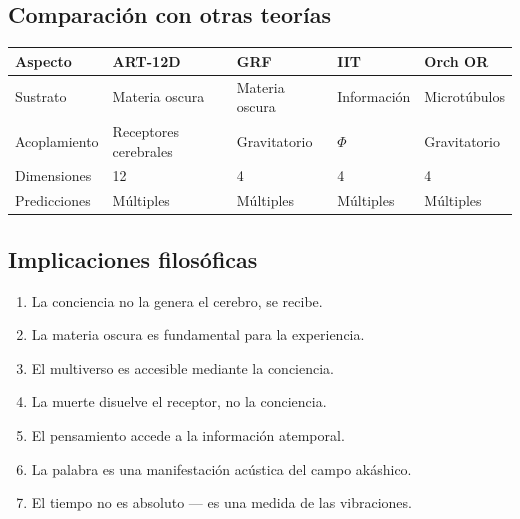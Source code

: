 \subsection{Comparación con otras teorías}
\begin{table}[H]
\centering
\begin{tabular}{@{}lllll@{}}
\toprule
\textbf{Aspecto} & \textbf{ART-12D} & \textbf{GRF} & \textbf{IIT} & \textbf{Orch OR} \\ \midrule
Sustrato & Materia oscura & Materia oscura & Información & Microtúbulos \\
Acoplamiento & Receptores cerebrales & Gravitatorio & $\Phi$ & Gravitatorio \\
Dimensiones & 12 & 4 & 4 & 4 \\
Predicciones & Múltiples & Múltiples & Múltiples & Múltiples \\ \bottomrule
\end{tabular}
\end{table}

\subsection{Implicaciones filosóficas}
\begin{enumerate}
    \item La conciencia no la genera el cerebro, se recibe.
    \item La materia oscura es fundamental para la experiencia.
    \item El multiverso es accesible mediante la conciencia.
    \item La muerte disuelve el receptor, no la conciencia.
    \item El pensamiento accede a la información atemporal.
    \item La palabra es una manifestación acústica del campo akáshico.
    \item El tiempo no es absoluto --- es una medida de las vibraciones.
\end{enumerate}

